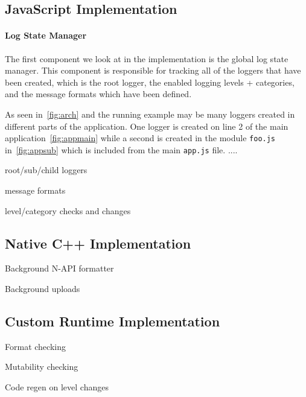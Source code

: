 \subsection{JavaScript Implementation}
\paragraph{Log State Manager}
\noindent
The first component we look at in the implementation is the global log state 
manager. This component is responsible for tracking all of the loggers that 
have been created, which is the root logger, the enabled logging levels + 
categories, and the message formats which have been defined. 

As seen in~\autoref{fig:arch} and the running example may be many loggers 
created in different parts of the application. One logger is created on line 
2 of the main application~\autoref{fig:appmain} while a second is created 
in the module \texttt{foo.js} in~\autoref{fig:appsub} which is included from 
the main \texttt{app.js} file. ....


root/sub/child loggers

message formats

level/category checks and changes

\subsection{Native C++ Implementation}

Background N-API formatter

Background uploads

\subsection{Custom Runtime Implementation}

Format checking

Mutability checking

Code regen on level changes
